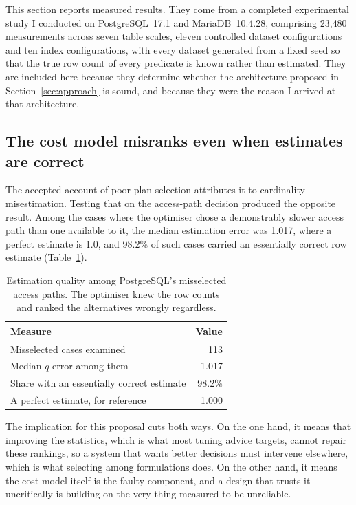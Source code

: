 \documentclass[12pt, a4paper]{article}
\begin{document}
This section reports measured results. They come from a completed
experimental study I conducted on PostgreSQL~17.1 and MariaDB~10.4.28,
comprising 23{,}480 measurements across seven table scales, eleven
controlled dataset configurations and ten index configurations, with
every dataset generated from a fixed seed so that the true row count of
every predicate is known rather than estimated. They are included here
because they determine whether the architecture proposed in
Section~\ref{sec:approach} is sound, and because they were the reason I
arrived at that architecture.

\subsection{The cost model misranks even when estimates are correct}

The accepted account of poor plan selection attributes it to
cardinality misestimation. Testing that on the access-path decision
produced the opposite result. Among the cases where the optimiser chose
a demonstrably slower access path than one available to it, the median
estimation error was 1.017, where a perfect estimate is 1.0, and 98.2\%
of such cases carried an essentially correct row estimate
(Table~\ref{tab:dissoc}).

\begin{table}[htbp]
\centering
\caption{Estimation quality among PostgreSQL's misselected access
paths. The optimiser knew the row counts and ranked the alternatives
wrongly regardless.}
\label{tab:dissoc}
\small
\begin{tabular}{@{}lr@{}}
\toprule
\textbf{Measure} & \textbf{Value} \\
\midrule
Misselected cases examined & 113 \\
Median $q$-error among them & 1.017 \\
Share with an essentially correct estimate & 98.2\% \\
A perfect estimate, for reference & 1.000 \\
\bottomrule
\end{tabular}
\end{table}

The implication for this proposal cuts both ways. On the one
hand, it means that improving the statistics, which is what most tuning
advice targets, cannot repair these rankings, so a system that wants
better decisions must intervene elsewhere, which is what selecting among
formulations does. On the other hand, it means the cost model itself is
the faulty component, and a design that trusts it uncritically is
building on the very thing measured to be unreliable.
\end{document}
